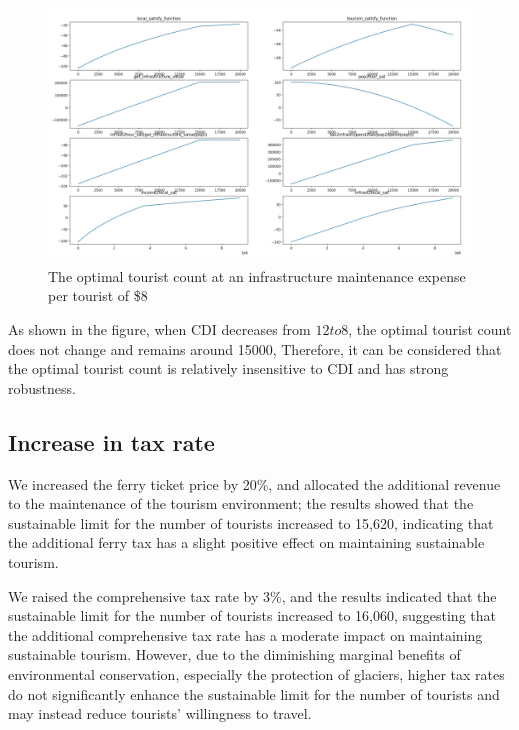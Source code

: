 \documentclass[12pt]{article}  %
\begin{document}
 
 \begin{figure}[H]  %
 
 \centering  %
 \includegraphics[width=.9\textwidth]{sensitivity8.png} %
 \caption{The optimal tourist count at an infrastructure maintenance expense per tourist of \$8} %
 \label{figy}%
 \end{figure}

 As shown in the figure, when CDI decreases from $12 to $8, the optimal tourist count does not change and remains around 15000,
 Therefore, it can be considered that the optimal tourist count is relatively insensitive to CDI and has strong robustness. 
 \subsection{Increase in tax rate}
    We increased the ferry ticket price by 20\%, and allocated the additional revenue to the maintenance of the tourism environment; the results showed that the sustainable limit for the number of tourists increased to 15,620, indicating that the additional ferry tax has a slight positive effect on maintaining sustainable tourism.
    
    We raised the comprehensive tax rate by 3\%, and the results indicated that the sustainable limit for the number of tourists increased to 16,060, suggesting that the additional comprehensive tax rate has a moderate impact on maintaining sustainable tourism. However, due to the diminishing marginal benefits of environmental conservation, especially the protection of glaciers, higher tax rates do not significantly enhance the sustainable limit for the number of tourists and may instead reduce tourists' willingness to travel.
\end{document}
